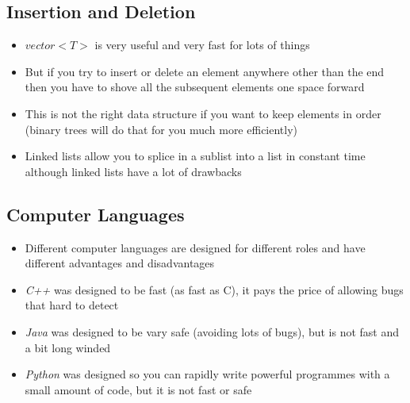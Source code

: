 \begin{slide}
\section{Insertion and Deletion}

\begin{PauseHighLight}
  \begin{itemize}
  \item \jl$vector<T>$ is very useful and very fast for lots of
    things\pause
  \item But if you try to insert or delete an element anywhere other
    than the end then you have to shove all the subsequent elements
    one space forward\pause
  \item This is not the right data structure if you want to keep
    elements in order\pause{} (binary trees will do that for
    you much more efficiently)\pauseb
  \item Linked lists allow you to splice in a sublist into a list in
    constant time\pause{} although linked lists have a lot of
    drawbacks\pauseb
  \end{itemize}
\end{PauseHighLight}

\end{slide}


\Outline


\begin{slide}
\section{Computer Languages}
  
\begin{PauseHighLight}
  \begin{itemize}
  \item Different computer languages are designed for different roles
    and have different advantages and disadvantages\pause
  \item \emph{C++} was designed to be fast (as fast as C)\pause, it
    pays the price of allowing bugs that hard to detect\pauseb
  \item \emph{Java} was designed to be vary safe (avoiding lots of
    bugs)\pause, but is not fast and a bit long winded\pauseb
  \item \emph{Python} was designed so you can rapidly write powerful
    programmes with a small amount of code\pause, but it is not fast
    or safe\pauseb
  \end{itemize}
\end{PauseHighLight}

\end{slide}

